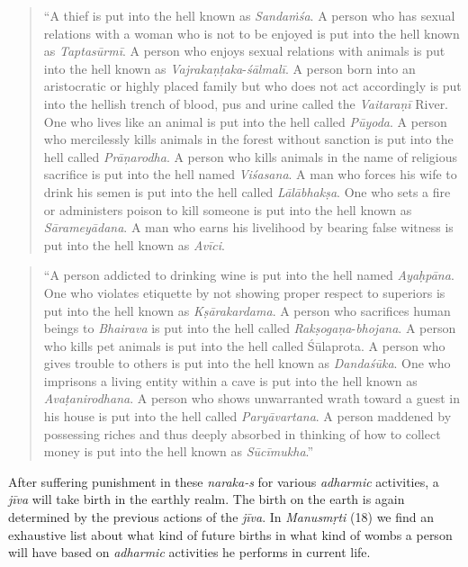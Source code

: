 \begin{quote}
``A thief is put into the hell known as \emph{Sandaṁśa}. A person who has sexual relations with a woman who is not to be enjoyed is put into the hell known as \emph{Taptasūrmī}. A person who enjoys sexual relations with animals is put into the hell known as \emph{Vajrakaṇṭaka}-\emph{śālmalī}. A person born into an aristocratic or highly placed family but who does not act accordingly is put into the hellish trench of blood, pus and urine called the \emph{Vaitaraṇī} River. One who lives like an animal is put into the hell called \emph{Pūyoda}. A person who mercilessly kills animals in the forest without sanction is put into the hell called \emph{Prāṇarodha}. A person who kills animals in the name of religious sacrifice is put into the hell named \emph{Viśasana}. A man who forces his wife to drink his semen is put into the hell called \emph{Lālābhakṣa}. One who sets a fire or administers poison to kill someone is put into the hell known as \emph{Sārameyādana}. A man who earns his livelihood by bearing false witness is put into the hell known as \emph{Avīci}.
\end{quote}

\begin{quote}
``A person addicted to drinking wine is put into the hell named \emph{Ayaḥpāna}. One who violates etiquette by not showing proper respect to superiors is put into the hell known as \emph{Kṣārakardama}. A person who sacrifices human beings to \emph{Bhairava} is put into the hell called \emph{Rakṣogaṇa}-\emph{bhojana}. A person who kills pet animals is put into the hell called Śūlaprota. A person who gives trouble to others is put into the hell known as \emph{Dandaśūka}. One who imprisons a living entity within a cave is put into the hell known as \emph{Avaṭanirodhana}. A person who shows unwarranted wrath toward a guest in his house is put into the hell called \emph{Paryāvartana}. A person maddened by possessing riches and thus deeply absorbed in thinking of how to collect money is put into the hell known as \emph{Sūcīmukha}.''
\end{quote}
\vskip 3pt

After suffering punishment in these \emph{naraka-s} for various \emph{adharmic} activities, a \emph{jīva} will take birth in the earthly realm. The birth on the earth is again determined by the previous actions of the \emph{jīva}. In \emph{Manusmṛti} (18) we find an exhaustive list about what kind of future births in what kind of wombs a person will have based on \emph{adharmic} activities he performs in current life.
\vskip 6pt

